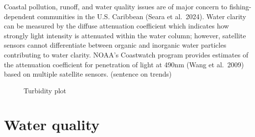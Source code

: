 \documentclass[
  letterpaper,
  oneside,
  open=any]{scrbook}
\begin{document}
Coastal pollution, runoff, and water quality issues are of major concern
to fishing-dependent communities in the U.S. Caribbean (Seara et
al.~2024). Water clarity can be measured by the diffuse attenuation
coefficient which indicates how strongly light intensity is attenuated
within the water column; however, satellite sensors cannot differentiate
between organic and inorganic water particles contributing to water
clarity. NOAA's Coastwatch program provides estimates of the attenuation
coefficient for penetration of light at 490nm (Wang et al.~2009) based
on multiple satellite sensors. (sentence on trends)

\begin{figure}


\caption{\label{fig-turb}Turbidity plot}

\end{figure}%

\section{Water quality}\label{water-quality}
\end{document}

